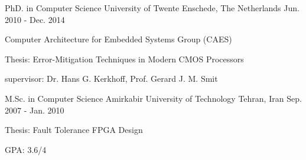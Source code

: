

\begin{cventries}

  \cventry
    {PhD. in Computer Science} %
    {University of Twente} %
    {Enschede, The Netherlands} %
    {Jun. 2010 - Dec. 2014} %
    {
      \begin{cvitems} %
	\item {Computer Architecture for Embedded Systems Group (CAES)}
        \item {Thesis: Error-Mitigation Techniques in Modern CMOS Processors}
	\item {supervisor: Dr. Hans G. Kerkhoff, Prof. Gerard J. M. Smit}
      \end{cvitems}
    }

  \cventry
    {M.Sc. in Computer Science} %
    {Amirkabir University of Technology} %
    {Tehran, Iran} %
    {Sep. 2007 - Jan. 2010} %
    {
      \begin{cvitems} %
        \item {Thesis: Fault Tolerance FPGA Design}
	\item {GPA: 3.6/4}
      \end{cvitems}
    }
\end{cventries}
